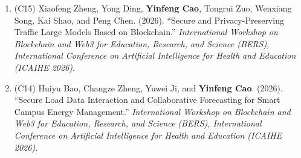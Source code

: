 \documentclass{resume}
\begin{document}
\begin{content}
    \begin{enumerate}
        \item (C15) Xiaofeng Zheng, Yong Ding, \textbf{Yinfeng Cao}, Tongrui Zuo, Wenxiang Song, Kai Shao, and Peng Chen. (2026). ``Secure and Privacy-Preserving Traffic Large Models Based on Blockchain.'' \textit{International Workshop on Blockchain and Web3 for Education, Research, and Science (BERS), International Conference on Artificial Intelligence for Health and Education (ICAIHE 2026)}.

        \item (C14) Huiyu Bao, Changze Zheng, Yuwei Ji, and \textbf{Yinfeng Cao}. (2026). ``Secure Load Data Interaction and Collaborative Forecasting for Smart Campus Energy Management.'' \textit{International Workshop on Blockchain and Web3 for Education, Research, and Science (BERS), International Conference on Artificial Intelligence for Health and Education (ICAIHE 2026)}.


\end{enumerate}
\end{content}
\end{document}
